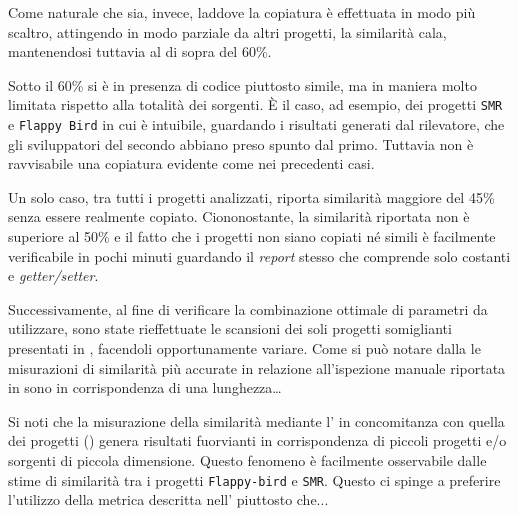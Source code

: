 Come naturale che sia, invece, laddove la copiatura è effettuata in modo più scaltro, attingendo in modo parziale da altri progetti, la similarità cala, mantenendosi tuttavia al di sopra del 60\%.

Sotto il 60\% si è in presenza di codice piuttosto simile, ma in maniera molto limitata rispetto alla totalità dei sorgenti.
%
\`E il caso, ad esempio, dei progetti \texttt{SMR} e \texttt{Flappy Bird} in cui è intuibile, guardando i risultati generati dal rilevatore, che gli sviluppatori del secondo abbiano preso spunto dal primo.
%
Tuttavia non è ravvisabile una copiatura evidente come nei precedenti casi.

Un solo caso, tra tutti i progetti analizzati, riporta similarità maggiore del 45\% senza essere realmente copiato.
%
Ciononostante, la similarità riportata non è superiore al 50\% e il fatto che i progetti non siano copiati né simili è facilmente verificabile in pochi minuti guardando il \textit{report} stesso che comprende solo costanti e \textit{getter/setter}.

Successivamente, al fine di verificare la combinazione ottimale di parametri da utilizzare, sono state rieffettuate le scansioni dei soli progetti somiglianti presentati in , facendoli opportunamente variare.
%
Come si può notare dalla  le misurazioni di similarità più accurate in relazione all'ispezione manuale riportata in  sono in corrispondenza di una lunghezza\dots

Si noti che la misurazione della similarità mediante l' in concomitanza con quella dei progetti () genera risultati fuorvianti in corrispondenza di piccoli progetti e/o sorgenti di piccola dimensione.
%
Questo fenomeno è facilmente osservabile dalle stime di similarità tra i progetti \texttt{Flappy-bird} e \texttt{SMR}. 
%
Questo ci spinge a preferire l'utilizzo della metrica descritta nell' piuttosto che...

